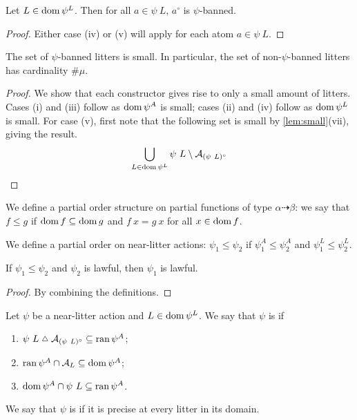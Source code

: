 \begin{lemma}
    Let \( L \in \operatorname{dom} \psi^L \).
    Then for all \( a \in \psi\ L \), \( a^\circ \) is \( \psi \)-banned.
\end{lemma}
\begin{proof}
    Either case (iv) or (v) will apply for each atom \( a \in \psi\ L \).
\end{proof}
\begin{lemma}
    \label{lem:bannedLitter_small}
    The set of \( \psi \)-banned litters is small.
    In particular, the set of non-\( \psi \)-banned litters has cardinality \( \#\mu \).
\end{lemma}
\begin{proof}
    We show that each constructor gives rise to only a small amount of litters.
    Cases (i) and (iii) follow as \( \operatorname{dom} \psi^A \) is small; cases (ii) and (iv) follow as \( \operatorname{dom} \psi^L \) is small.
    For case (v), first note that the following set is small by \cref{lem:small}(vii), giving the result.
    \[ \bigcup_{L \in \operatorname{dom} \psi^L} \psi\ L \setminus \mathcal A_{(\psi\ L)^\circ} \]
\end{proof}
\begin{definition}
    We define a partial order structure on partial functions of type \( \alpha \rightdasharrow \beta \): we say that \( f \leq g \) if \( \operatorname{dom} f \subseteq \operatorname{dom} g \) and \( f\ x = g\ x \) for all \( x \in \operatorname{dom} f \).
\end{definition}
\begin{definition}
    We define a partial order on near-litter actions: \( \psi_1 \leq \psi_2 \) if \( \psi_1^A \leq \psi_2^A \) and \( \psi_1^L \leq \psi_2^L \).
\end{definition}
\begin{lemma}
    \label{lem:NearLitterAction.Lawful.le}
    If \( \psi_1 \leq \psi_2 \) and \( \psi_2 \) is lawful, then \( \psi_1 \) is lawful.
\end{lemma}
\begin{proof}
    By combining the definitions.
\end{proof}
\begin{definition}
    Let \( \psi \) be a near-litter action and \( L \in \operatorname{dom} \psi^L \).
    We say that \( \psi \) is  if
    \begin{enumerate}
        \item \( \psi\ L \symmdiff \mathcal A_{(\psi\ L)^\circ} \subseteq \ran \psi^A \);
        \item \( \operatorname{ran} \psi^A \cap \mathcal A_L \subseteq \operatorname{dom} \psi^A \);
        \item \( \operatorname{dom} \psi^A \cap \psi\ L \subseteq \operatorname{ran} \psi^A \).
    \end{enumerate}
    We say that \( \psi \) is  if it is precise at every litter in its domain.
\end{definition}
